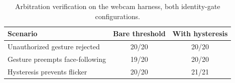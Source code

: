 \begin{table}[t]
\caption{Arbitration verification on the webcam harness, both identity-gate configurations.}
\label{tab:webcam}
\centering
\begin{tabular}{lcc}
\toprule
Scenario & Bare threshold & With hysteresis \\
\midrule
Unauthorized gesture rejected & 20/20 & 20/20 \\
Gesture preempts face-following & 19/20 & 20/20 \\
Hysteresis prevents flicker & 20/20 & 21/21 \\
\bottomrule
\end{tabular}
\end{table}
